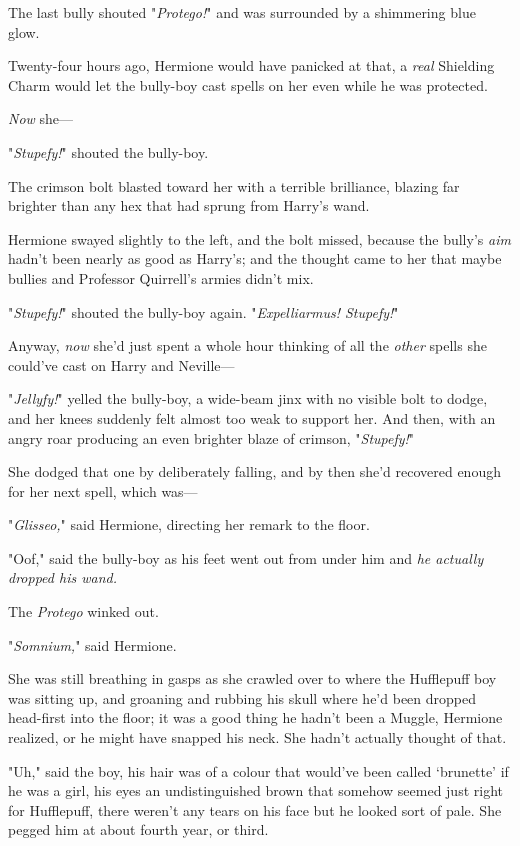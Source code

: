 The last bully shouted "\emph{Protego!}" and was surrounded by a shimmering
blue glow.

Twenty-four hours ago, Hermione would have panicked at that, a \emph{real}
Shielding Charm would let the bully-boy cast spells on her even while he was
protected.

\emph{Now} she---

"\emph{Stupefy!}" shouted the bully-boy.

The crimson bolt blasted toward her with a terrible brilliance, blazing far
brighter than any hex that had sprung from Harry's wand.

Hermione swayed slightly to the left, and the bolt missed, because the bully's
\emph{aim} hadn't been nearly as good as Harry's; and the thought came to her
that maybe bullies and Professor Quirrell's armies didn't mix.

"\emph{Stupefy!}" shouted the bully-boy again. "\emph{Expelliarmus! Stupefy!}"

Anyway, \emph{now} she'd just spent a whole hour thinking of all the
\emph{other} spells she could've cast on Harry and Neville---

"\emph{Jellyfy!}" yelled the bully-boy, a wide-beam jinx with no visible bolt
to dodge, and her knees suddenly felt almost too weak to support her. And then,
with an angry roar producing an even brighter blaze of crimson,
"\emph{Stupefy!}"

She dodged that one by deliberately falling, and by then she'd recovered enough
for her next spell, which was---

"\emph{Glisseo,}" said Hermione, directing her remark to the floor.

"Oof," said the bully-boy as his feet went out from under him and \emph{he
actually dropped his wand.}

The \emph{Protego} winked out.

"\emph{Somnium,}" said Hermione.

She was still breathing in gasps as she crawled over to where the Hufflepuff
boy was sitting up, and groaning and rubbing his skull where he'd been dropped
head-first into the floor; it was a good thing he hadn't been a Muggle,
Hermione realized, or he might have snapped his neck. She hadn't actually
thought of that.

"Uh," said the boy, his hair was of a colour that would've been called
`brunette' if he was a girl, his eyes an undistinguished brown that somehow
seemed just right for Hufflepuff, there weren't any tears on his face but he
looked sort of pale. She pegged him at about fourth year, or third.

